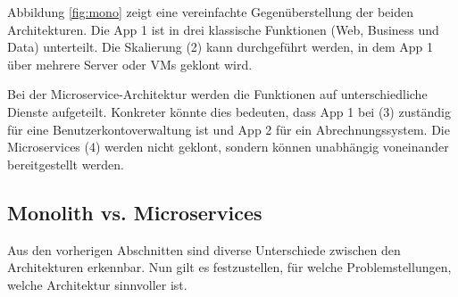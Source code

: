Abbildung \ref{fig:mono} zeigt eine vereinfachte Gegenüberstellung der beiden Architekturen. Die App 1 ist in drei klassische Funktionen (Web, Business und Data) unterteilt. Die Skalierung (2) kann durchgeführt werden, in dem App 1 über mehrere Server oder VMs geklont wird. 

Bei der Microservice-Architektur werden die Funktionen auf unterschiedliche Dienste aufgeteilt. Konkreter könnte dies bedeuten, dass App 1 bei (3) zuständig für eine Benutzerkontoverwaltung ist und App 2 für ein Abrechnungssystem. Die Microservices (4) werden nicht geklont, sondern können unabhängig voneinander bereitgestellt werden. 

\subsection{Monolith vs. Microservices}\label{sec:monolith_vs_microservices}
Aus den vorherigen Abschnitten sind diverse Unterschiede zwischen den Architekturen erkennbar. Nun gilt es festzustellen, für welche Problemstellungen, welche Architektur sinnvoller ist. \cite{wolff2016mic_architectures} \cite{birk2016mic_soa}
